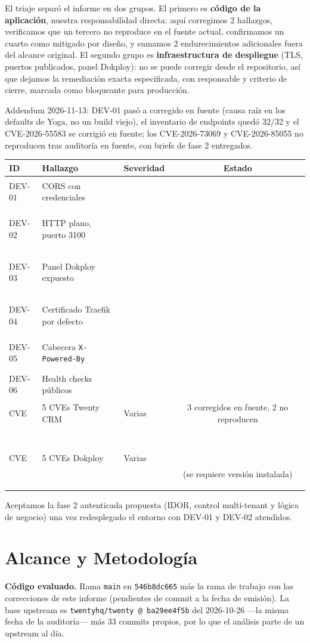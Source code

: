 \documentclass[11pt,a4paper]{article}
\newcommand{\badge}[2]{\colorbox{#1}{\textcolor{white}{\strut\footnotesize\bfseries #2}}}
\newcommand{\CRIT}{\badge{sevCritical}{CRÍTICA}}
\newcommand{\HIGH}{\badge{sevHigh}{ALTA}}
\newcommand{\MED}{\badge{sevMedium}{MEDIA}}
\newcommand{\LOW}{\badge{sevLow}{BAJA}}
\newcommand{\FIXED}{\badge{stOk}{CORREGIDO}}
\newcommand{\MITIG}{\badge{stInfo}{MITIGADO POR DISEÑO}}
\newcommand{\PEND}{\badge{stPending}{PENDIENTE INFRAESTRUCTURA}}
\newcommand{\PVER}{\badge{stPending}{PENDIENTE VERIFICACIÓN}}
\begin{document}
El triaje separó el informe en dos grupos. El primero es \textbf{código de la
aplicación}, nuestra responsabilidad directa: aquí corregimos 2 hallazgos, verificamos
que un tercero no reproduce en el fuente actual, confirmamos un cuarto como mitigado por
diseño, y sumamos 2 endurecimientos adicionales fuera del alcance original. El segundo
grupo es \textbf{infraestructura de despliegue} (TLS, puertos publicados, panel
Dokploy): no se puede corregir desde el repositorio, así que dejamos la remediación
exacta especificada, con responsable y criterio de cierre, marcada como bloqueante para
producción.

Addendum 2026-11-13: DEV-01 pasó a corregido en fuente (causa raíz en los
defaults de Yoga, no un build viejo), el inventario de endpoints quedó 32/32 y
el CVE-2026-55583 se corrigió en fuente; los CVE-2026-73069 y CVE-2026-85055 no
reproducen tras auditoría en fuente, con briefs de fase 2 entregados.

\begin{center}
\begin{tabular}{lllc}
\toprule
ID & Hallazgo & Severidad & Estado \\
\midrule
DEV-01 & CORS con credenciales & \CRIT & \FIXED \\
DEV-02 & HTTP plano, puerto 3100 & \HIGH & \PEND \\
DEV-03 & Panel Dokploy expuesto & \MED & \PEND \\
DEV-04 & Certificado Traefik por defecto & \MED & \PEND \\
DEV-05 & Cabecera \texttt{X-Powered-By} & \LOW & \FIXED \\
DEV-06 & Health checks públicos & \LOW & \MITIG \\
\midrule
CVE & 5 CVEs Twenty CRM & Varias & 3 corregidos en fuente, 2 no reproducen \\
CVE & 5 CVEs Dokploy & Varias & \PVER{} (se requiere versión instalada) \\
\bottomrule
\end{tabular}
\end{center}

Aceptamos la fase 2 autenticada propuesta (IDOR, control multi-tenant y lógica de
negocio) una vez redesplegado el entorno con DEV-01 y DEV-02 atendidos.

\section{Alcance y Metodología}

\textbf{Código evaluado.} Rama \texttt{main} en \texttt{546b8dc665} más la rama de
trabajo con las correcciones de este informe (pendientes de commit a la fecha de
emisión). La base upstream es \texttt{twentyhq/twenty @ ba29ee4f5b} del 2026-10-26
---la misma fecha de la auditoría--- más 33 commits propios, por lo que el análisis
parte de un upstream al día.
\end{document}
